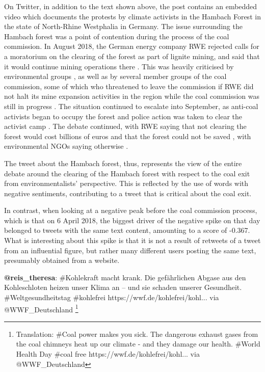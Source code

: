 \documentclass[12pt,onecolumn,twoside]{layout}
\begin{document}
On Twitter, in addition to the text shown above, the post contains an embedded video which documents the protests by climate activists in the Hambach Forest in the state of North-Rhine Westphalia in Germany. The issue surrounding the Hambach forest was a point of contention during the process of the coal commission. In August 2018, the German energy company RWE rejected calls for a moratorium on the clearing of the forest as part of lignite mining, and said that it would continue mining operations there \citep{Knuf2018}. This was heavily criticised by environmental groups \citep{Schafer2018}, as well as by several member groups of the coal commission, some of which who threatened to leave the commission if RWE did not halt its mine expansion activities in the region while the coal commission was still in progress \citep{Wehrmann2018a}. The situation continued to escalate into September, as anti-coal activists began to occupy the forest and police action was taken to clear the activist camp \citep{CEW2018}. The debate continued, with RWE saying that not clearing the forest would cost billions of euros and that the forest could not be saved \citep{CEW2018a}, with environmental NGOs saying otherwise \citep{Kopiske2018}.

The tweet about the Hambach forest, thus, represents the view of the entire debate around the clearing of the Hambach forest with respect to the coal exit from environmentalists' perspective. This is reflected by the use of words with negative sentiments, contributing to a tweet that is critical about the coal exit.

In contrast, when looking at a negative peak before the coal commission process, which is that on 6 April 2018, the biggest driver of the negative spike on that day belonged to tweets with the same text content, amounting to a score of -0.367. What is interesting about this spike is that it is not a result of retweets of a tweet from an influential figure, but rather many different users posting the same text, presumably obtained from a website.

\begin{displayquote}
	\textbf{@reis\_theresa}: \#Kohlekraft macht krank. Die gefährlichen Abgase aus den Kohleschloten heizen unser Klima an – und sie schaden unserer Gesundheit. \#Weltgesundheitstag \#kohlefrei https://wwf.de/kohlefrei/kohl... via @WWF\_Deutschland
	\footnote{Translation: \#Coal power makes you sick. The dangerous exhaust gases from the coal chimneys heat up our climate - and they damage our health. \#World Health Day \#coal free https://wwf.de/kohlefrei/kohl... via @WWF\_Deutschland}
\end{displayquote}
\end{document}
